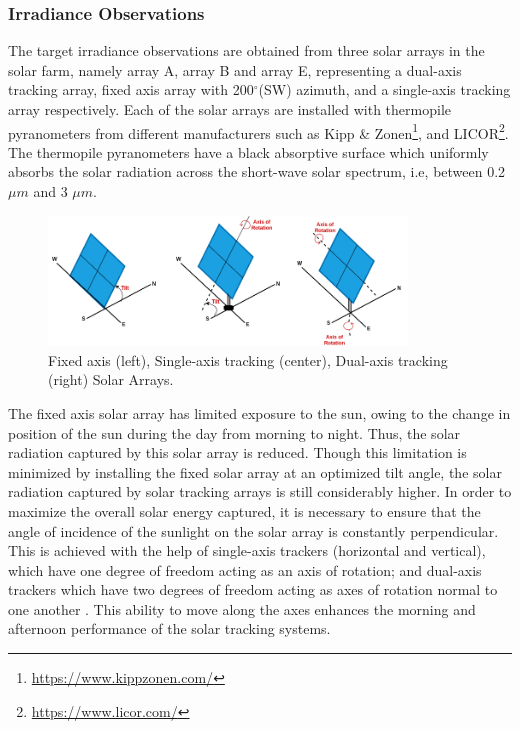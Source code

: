 \subsubsection*{Irradiance Observations}
\par The target irradiance observations are obtained from three solar arrays in the solar farm, namely array A, array B and array E, representing a dual-axis tracking array, fixed axis array with 200$^{\circ}$(SW) azimuth, and a single-axis tracking array respectively. Each of the solar arrays are installed with thermopile pyranometers from different manufacturers such as Kipp \& Zonen\footnote{\url{https://www.kippzonen.com/}}, and LICOR\footnote{\url{https://www.licor.com/}}. The thermopile pyranometers have a black absorptive surface which uniformly absorbs the solar radiation across the short-wave solar spectrum, i.e, between 0.2 $\mu m$ and 3 $\mu m$. 

\begin{figure}[ht]
    \begin{center}
    	\includegraphics[width=0.85\textwidth]{chapter3/fig_pyranometers.png}
    	\caption[Fixed axis, Single-axis tracking, Dual-axis tracking Solar Arrays]{Fixed axis (left), Single-axis tracking (center), Dual-axis tracking (right) Solar Arrays.}
    	\label{fig:fig_pyranometers}
    \end{center}
\end{figure}

The fixed axis solar array has limited exposure to the sun, owing to the change in position of the sun during the day from morning to night. Thus, the solar radiation captured by this solar array is reduced. Though this limitation is minimized by installing the fixed solar array at an optimized tilt angle, the solar radiation captured by solar tracking arrays is still considerably higher. In order to maximize the overall solar energy captured, it is necessary to ensure that the angle of incidence of the sunlight on the solar array is constantly perpendicular. This is achieved with the help of single-axis trackers (horizontal and vertical), which have one degree of freedom acting as an axis of rotation; and dual-axis trackers which have two degrees of freedom acting as axes of rotation normal to one another \cite{irradiance_solartracker}. This ability to move along the axes enhances the morning and afternoon performance of the solar tracking systems.

